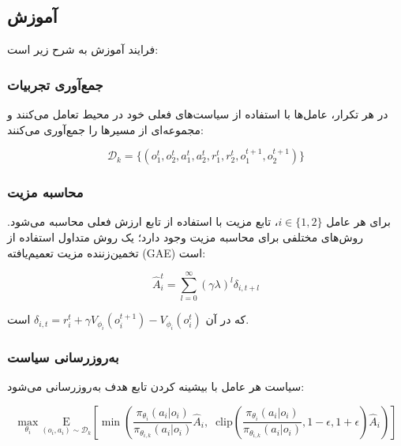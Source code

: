 
\subsection{آموزش }

فرایند آموزش  به شرح زیر است:

\subsubsection{جمع‌آوری تجربیات}

در هر تکرار، عامل‌ها با استفاده از سیاست‌های فعلی خود در محیط تعامل می‌کنند و مجموعه‌ای از مسیرها را جمع‌آوری می‌کنند:

\begin{equation}
    \mathcal{D}_k = \{(o_1^t, o_2^t, a_1^t, a_2^t, r_1^t, r_2^t, o_1^{t+1}, o_2^{t+1})\}
\end{equation}

\subsubsection{محاسبه مزیت}

برای هر عامل $i \in \{1, 2\}$، تابع مزیت با استفاده از تابع ارزش فعلی محاسبه می‌شود. روش‌های مختلفی برای محاسبه مزیت وجود دارد؛ یک روش متداول استفاده از تخمین‌زننده مزیت تعمیم‌یافته (GAE) است:

\begin{equation}
    \hat{A}_i^t = \sum_{l=0}^{\infty} (\gamma\lambda)^l \delta_{i,t+l}
\end{equation}

که در آن $\delta_{i,t} = r_i^t + \gamma V_{\phi_i}(o_i^{t+1}) - V_{\phi_i}(o_i^t)$ است.

\subsubsection{به‌روزرسانی سیاست}

سیاست هر عامل با بیشینه کردن تابع هدف  به‌روزرسانی می‌شود:

\begin{equation}
    \max_{\theta_i} \underset{(o_i,a_i) \sim \mathcal{D}_k}{\mathrm{E}}\left[ \min\left( \frac{\pi_{\theta_i}(a_i|o_i)}{\pi_{\theta_{i,k}}(a_i|o_i)} \hat{A}_i, \;\; \text{clip}\left(\frac{\pi_{\theta_i}(a_i|o_i)}{\pi_{\theta_{i,k}}(a_i|o_i)}, 1 - \epsilon, 1+\epsilon \right) \hat{A}_i \right) \right]
\end{equation}

